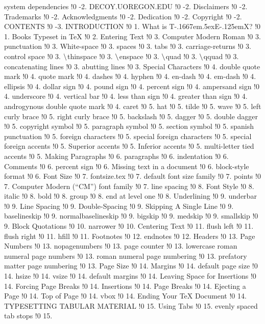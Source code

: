 system dependencies !0 -2.
DECOY.UOREGON.EDU !0 -2.
Disclaimers !0 -2.
Trademarks !0 -2.
Acknowledgments !0 -2.
Dedication !0 -2.
Copyright !0 -2.
CONTENTS !0 -3.
INTRODUCTION !0 1.
What is T\kern -.1667em\lower .5ex\hbox {E}\kern -.125emX{}? !0 1.
Books Typeset in TeX !0 2.
Entering Text !0 3.
Computer Modern Roman !0 3.
punctuation !0 3.
White-space !0 3.
spaces !0 3.
tabs !0 3.
carriage-returns !0 3.
control space !0 3.
$\delimiter "26E30F $thinspace !0 3.
$\delimiter "26E30F $enspace !0 3.
$\delimiter "26E30F $quad !0 3.
$\delimiter "26E30F $qquad !0 3.
concatenating lines !0 3.
abutting lines !0 3.
Special Characters !0 4.
double quote mark !0 4.
quote mark !0 4.
dashes !0 4.
hyphen !0 4.
en-dash !0 4.
em-dash !0 4.
ellipsis !0 4.
dollar sign !0 4.
pound sign !0 4.
percent sign !0 4.
ampersand sign !0 4.
underscore !0 4.
vertical bar !0 4.
less than sign !0 4.
greater than sign !0 4.
androgynous double quote mark !0 4.
caret !0 5.
hat !0 5.
tilde !0 5.
wave !0 5.
left curly brace !0 5.
right curly brace !0 5.
backslash !0 5.
dagger !0 5.
double dagger !0 5.
copyright symbol !0 5.
paragraph symbol !0 5.
section symbol !0 5.
spanish punctuation !0 5.
foreign characters !0 5.
special foreign characters !0 5.
special foreign accents !0 5.
Superior accents !0 5.
Inferior accents !0 5.
multi-letter tied accents !0 5.
Making Paragraphs !0 6.
paragraphs !0 6.
indentation !0 6.
Comments !0 6.
percent sign !0 6.
Missing text in a document !0 6.
block-style format !0 6.
Font Size !0 7.
fontsize.tex !0 7.
default font size family !0 7.
points !0 7.
Computer Modern (``CM'') font family !0 7.
line spacing !0 8.
Font Style !0 8.
italic !0 8.
bold !0 8.
group !0 8.
end at level one !0 8.
Underlining !0 9.
underbar !0 9.
Line Spacing !0 9.
Double-Spacing !0 9.
Skipping A Single Line !0 9.
baselineskip !0 9.
normalbaselineskip !0 9.
bigskip !0 9.
medskip !0 9.
smallskip !0 9.
Block Quotations !0 10.
narrower !0 10.
Centering Text !0 11.
flush left !0 11.
flush right !0 11.
hfill !0 11.
Footnotes !0 12.
endnotes !0 12.
Headers !0 13.
Page Numbers !0 13.
nopagenumbers !0 13.
page counter !0 13.
lowercase roman numeral page numbers !0 13.
roman numeral page numbering !0 13.
prefatory matter page numbering !0 13.
Page Size !0 14.
Margins !0 14.
default page size !0 14.
hsize !0 14.
vsize !0 14.
default margins !0 14.
Leaving Space for Insertions !0 14.
Forcing Page Breaks !0 14.
Insertions !0 14.
Page Breaks !0 14.
Ejecting a Page !0 14.
Top of Page !0 14.
vbox !0 14.
Ending Your TeX Document !0 14.
TYPESETTING TABULAR MATERIAL !0 15.
Using Tabs !0 15.
evenly spaced tab stops !0 15.
